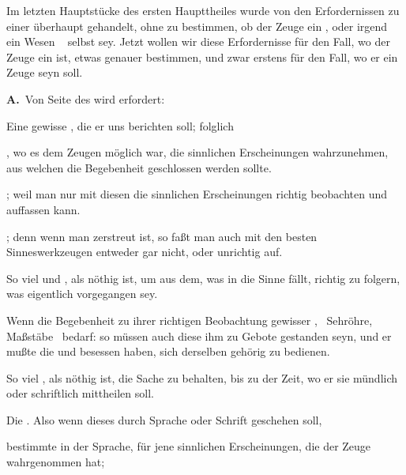 Im letzten Hauptstücke des ersten Haupttheiles wurde von den Erfordernissen zu einer  überhaupt gehandelt, ohne zu bestimmen, ob der Zeuge ein , oder irgend ein  Wesen \zB\  selbst sey. Jetzt wollen wir diese Erfordernisse für den Fall, wo der Zeuge ein  ist, etwas genauer bestimmen, und zwar erstens für den Fall, wo er ein  Zeuge seyn soll.~\par

\vabst \textbf{A.}~Von Seite des  wird erfordert:
\begin{aufza}
\item Eine gewisse , die er uns berichten soll; folglich
\begin{aufzb}
\item {}, wo es dem Zeugen möglich war, die sinnlichen Erscheinungen wahrzunehmen, aus welchen die Begebenheit geschlossen werden sollte.
\item {}; weil man nur mit diesen die sinnlichen Erscheinungen richtig beobachten und auffassen kann.
\item {}; denn wenn man zerstreut ist, so faßt man auch mit den besten Sinneswerkzeugen entweder gar nicht, oder unrichtig auf.
\item So viel  und , als nöthig ist, um aus dem, was in die Sinne fällt, richtig zu folgern, was eigentlich vorgegangen sey.
\item Wenn die Begebenheit zu ihrer richtigen Beobachtung gewisser , \zB\ Sehröhre, Maßstäbe \udgl\  bedarf: so müssen auch diese ihm zu Gebote gestanden seyn, und er mußte die  und  besessen haben, sich derselben gehörig zu bedienen.
\item So viel , als nöthig ist, die Sache zu behalten, bis zu der Zeit, wo er sie mündlich oder schriftlich mittheilen soll.
\end{aufzb}
\item Die . Also wenn dieses durch Sprache oder Schrift geschehen soll,
\begin{aufzb}
\item bestimmte  in der Sprache, für jene sinnlichen Erscheinungen, die der Zeuge wahrgenommen hat;

\end{aufzb}
\end{aufza}
